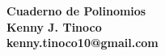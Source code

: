 
\begin{center} \textbf
{
        {\LARGE Cuaderno de Polinomios}\\\vspace{4mm}
Kenny J. Tinoco\\\vspace{1mm}
kenny.tinoco10@gmail.com
}
\end{center}


\thispagestyle{first-page-style}

\tableofcontents